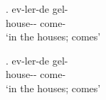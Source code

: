 
\GlossMorphAlign
\ex. \gll ev-ler-de gel- \\
          house-- come- \\
\glt `in the houses; comes'

\GlossMorphAlignOff
\ex. \gll ev-ler-de gel- \\
          house-- come- \\
\glt `in the houses; comes'



